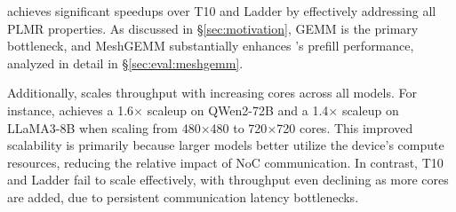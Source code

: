\sys achieves significant speedups over T10 and Ladder by effectively addressing all PLMR properties. As discussed in \S\ref{sec:motivation}, GEMM is the primary bottleneck, and MeshGEMM substantially enhances \sys’s prefill performance, analyzed in detail in \S\ref{sec:eval:meshgemm}.

Additionally, \sys scales throughput with increasing cores across all models. For instance, \sys achieves a 1.6$\times$ scaleup on QWen2-72B and a 1.4$\times$ scaleup on LLaMA3-8B when scaling from 480$\times$480 to 720$\times$720 cores.
This improved scalability is primarily because larger models better utilize the device’s compute resources, reducing the relative impact of NoC communication. In contrast, T10 and Ladder fail to scale effectively, with throughput even declining as more cores are added, due to persistent communication latency bottlenecks.


\begin{table}[t]
  \centering
  \caption{Decode throughput (tokens/s)}
  \vspace{-0.3cm}
\label{tab:decode_throughput}
\end{table}%

